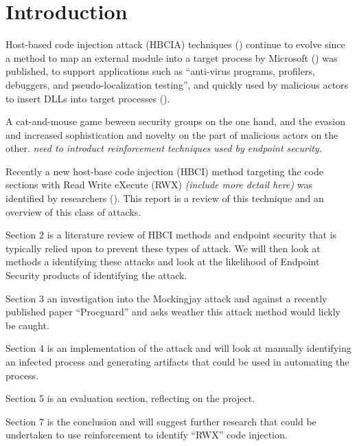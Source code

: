 \section{Introduction}

Host-based code injection attack (HBCIA) techniques (\cite{6999410}) continue to evolve since a method to map an external module into a target process by Microsoft (\cite{Ghizzoni:2004}) was published, to support applications such as ``anti-virus programs, profilers, debuggers, and pseudo-localization testing'', and quickly used by malicious actors to insert DLLs into target processes (\cite{4420399}).

A cat-and-mouse game beween security groups on the one hand, and the evasion and increased sophistication and novelty on the part of malicious actors on the other.  \textit{need to introduct reinforcement techniques used by endpoint security.} 

Recently a new host-base code injection (HBCI) method targeting the code sections with Read Write eXecute (RWX)  \textit{(include more detail here)} was identified by researchers (\cite{Peixoto:2023}).  This report is a review of this technique and an overview of this class of attacks.

Section 2 is a literature review of HBCI methods and endpoint security that is typically relied upon to prevent these types of attack.  We will then look at methods a identifying these attacks and look at the likelihood of Endpoint Security products of identifying the attack.

Section 3 an investigation into the Mockingjay attack and against a recently published paper ``Procguard'' \cite{10063560} and asks weather this attack method would lickly be caught.


Section 4 is an implementation of the attack and will look at manually identifying an infected process and generating artifacts that could be used in automating the process.

Section 5 is an evaluation section, reflecting on the project.

Section 7 is the conclusion and will suggest further research that could be undertaken to use reinforcement to identify ``RWX'' code injection.
